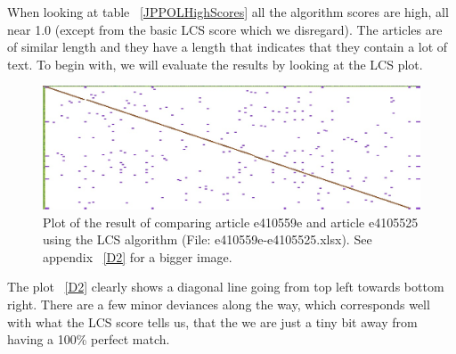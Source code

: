 When looking at table ~\ref{JPPOLHighScores} all the algorithm scores are high, all near 1.0 (except from the basic LCS score which we disregard). The articles are of similar length and they have a length that indicates that they contain a lot of text. To begin with, we will evaluate the results by looking at the LCS plot.


\begin{figure}
	\centering
	\includegraphics[scale=0.35]{figures/e410559e}
	\caption{Plot of the result of comparing article e410559e and article e4105525 using the LCS algorithm (File: e410559e-e4105525.xlsx). See appendix ~\ref{D2} for a bigger image.}
	\label{JPPOLHighestLCS}
\end{figure}

The plot ~\ref{D2} clearly shows a diagonal line going from top left towards bottom right. There are a few minor deviances along the way, which corresponds well with what the LCS score tells us, that the we are just a tiny bit away from having a 100\% perfect match. 

